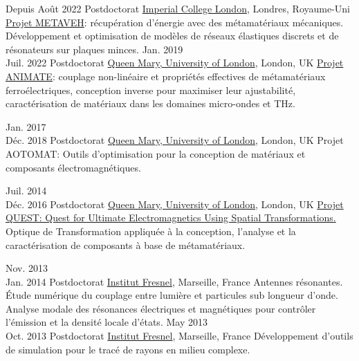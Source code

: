 \documentclass{cv}
\begin{document}
\begin{entrylist}
	\entry
	{Depuis Août 2022}
	{Postdoctorat}
	{\href{http://imperial.ac.uk/}{Imperial College London}, Londres, Royaume-Uni}
	{\href{https://www.metaveh.com/}{Projet METAVEH}: récupération d'énergie avec des métamatériaux mécaniques. Développement et optimisation de modèles de réseaux élastiques discrets et de résonateurs sur plaques minces.
	}
	\entry
	{Jan. 2019 \\Juil. 2022}
	{Postdoctorat}
	{\href{http://antennas.eecs.qmul.ac.uk/}{Queen Mary, University of London}, London, UK}
	{\href{https://animate-research.com/}{Projet ANIMATE}: couplage non-linéaire et propriétés effectives de métamatériaux ferroélectriques, conception inverse pour maximiser leur ajustabilité,
		caractérisation de matériaux dans les domaines micro-ondes et THz.
	}


	\entry
	{Jan. 2017 \\Déc. 2018}
	{Postdoctorat}
	{\href{http://antennas.eecs.qmul.ac.uk/}{Queen Mary, University of London}, London, UK}
	{Projet AOTOMAT: Outils d'optimisation pour la conception de matériaux et composants électromagnétiques.
	}

	\entry
	{Juil. 2014 \\Déc. 2016}
	{Postdoctorat}
	{\href{http://antennas.eecs.qmul.ac.uk/}{Queen Mary, University of London}, London, UK}
	{\href{http://www.quest-spatial-transformation.org/}{Projet QUEST: Quest for Ultimate Electromagnetics Using Spatial Transformations.}
		Optique de Transformation appliquée à la conception, l'analyse et la caractérisation de composants à base de métamatériaux.
	}


	\entry
	{Nov. 2013\\ Jan. 2014}
	{Postdoctorat}
	{\href{http://www.fresnel.fr/}{Institut Fresnel}, Marseille, France}
	{
		Antennes résonantes. \'Etude numérique du couplage entre lumière et particules sub longueur d'onde.
		Analyse modale des résonances électriques et magnétiques pour contrôler l'émission et la densité locale d'états.
	}
	\entry
	{May 2013 \\Oct. 2013}
	{Postdoctorat}
	{\href{http://www.fresnel.fr/}{Institut Fresnel}, Marseille, France}
	{
		Développement d'outils de simulation pour le tracé de rayons en milieu complexe.
	}


\end{entrylist}
\end{document}
